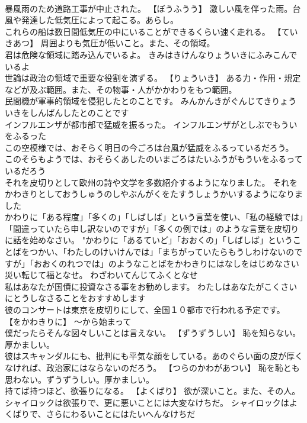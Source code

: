 \documentclass[8pt]{extreport}
\begin{document}
\begin{CJK}{UTF8}{min}
\\	暴風雨のため道路工事が中止された。	【ぼうふうう】 激しい風を伴った雨。台風や発達した低気圧によって起こる。あらし。
\\	これらの船は数日間低気圧の中にいることができるくらい速く走れる。	【ていきあつ】 周囲よりも気圧が低いこと。また、その領域。
\\	君は危険な領域に踏み込んでいるよ。	きみはきけんなりょういきにふみこんでいるよ 
\\	世論は政治の領域で重要な役割を演ずる。	【りょういき】 ある力・作用・規定などが及ぶ範囲。また、その物事・人がかかわりをもつ範囲。
\\	民間機が軍事的領域を侵犯したとのことです。	みんかんきがぐんじてきりょういきをしんぱんしたとのことです 
\\	インフルエンザが都市部で猛威を振るった。	インフルエンザがとしぶでもういをふるった 
\\	この空模様では、おそらく明日の今ごろは台風が猛威をふるっているだろう。	このそらもようでは、おそらくあしたのいまごろはたいふうがもういをふるっているだろう 
\\	それを皮切りとして欧州の詩や文学を多数紹介するようになりました。	それをかわきりとしておうしゅうのしやぶんがくをたすうしょうかいするようになりました 
\\	かわりに「ある程度」「多くの」「しばしば」という言葉を使い、「私の経験では」「間違っていたら申し訳ないのですが」「多くの例では」のような言葉を皮切りに話を始めなさい。	"かわりに「あるていど」「おおくの」「しばしば」ということばをつかい、「わたしのけいけんでは」「まちがっていたらもうしわけないのですが」「おおくのれつでは」のようなことばをかわきりにはなしをはじめなさい 
\\	災い転じて福となせ。	わざわいてんじてふくとなせ 
\\	私はあなたが国債に投資なさる事をお勧めします。	わたしはあなたがこくさいにとうしなさることをおすすめします 
\\	彼のコンサートは東京を皮切りにして、全国１０都市で行われる予定です。	【をかわきりに】 ～から始まって
\\	僕だったらそんな図々しいことは言えない。	【ずうずうしい】 恥を知らない。厚かましい。
\\	彼はスキャンダルにも、批判にも平気な顔をしている。あのぐらい面の皮が厚くなければ、政治家にはならないのだろう。	【つらのかわがあつい】 恥を恥とも思わない。ずうずうしい。厚かましい。
\\	持てば持つほど、欲張りになる。	【よくばり】 欲が深いこと。また、その人。
\\	シャイロックは欲張りで、更に悪いことには大変なけちだ。	シャイロックはよくばりで、さらにわるいことにはたいへんなけちだ 

\end{CJK}
\end{document}
